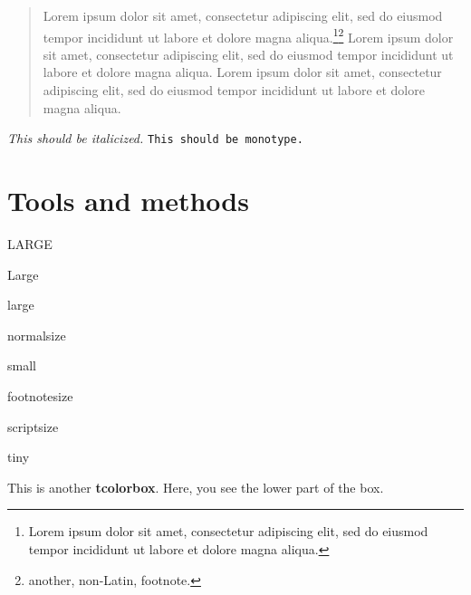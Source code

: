 \documentclass[
  11pt,
  american,
  letterpaper,
  ]{article}
\begin{document}
\begin{quote}
Lorem ipsum dolor sit amet, consectetur adipiscing elit, sed do eiusmod
tempor incididunt ut labore et dolore magna
aliqua.\footnote{Lorem ipsum dolor sit amet, consectetur adipiscing
  elit, sed do eiusmod tempor incididunt ut labore et dolore magna
  aliqua.}\footnote{another, non-Latin, footnote.} Lorem ipsum dolor sit
amet, consectetur adipiscing elit, sed do eiusmod tempor incididunt ut
labore et dolore magna aliqua. Lorem ipsum dolor sit amet, consectetur
adipiscing elit, sed do eiusmod tempor incididunt ut labore et dolore
magna aliqua.
\end{quote}

\textit{This should be italicized.} \texttt{This should be monotype.}

\clearpage

\hypertarget{tools-and-methods}{%
\section{Tools and methods}\label{tools-and-methods}}

\begin{framed}
\begin{LARGE}LARGE\end{LARGE}

\begin{Large}Large\end{Large}

\begin{large}large\end{large}

\begin{normalsize}normalsize\end{normalsize}

\begin{small}small\end{small}

\begin{footnotesize}footnotesize\end{footnotesize}

\begin{scriptsize}scriptsize\end{scriptsize}

\begin{tiny}tiny\end{tiny}
\end{framed}

\begin{tcolorbox}[colback=red!5!white,colframe=red!75!black,title=My nice heading]
This is another \textbf{tcolorbox}.
\tcblower
Here, you see the lower part of the box.
\end{tcolorbox}
\end{document}
